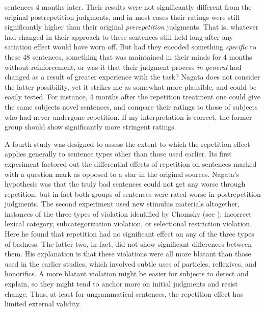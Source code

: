 sentences 4 months later. Their results were not significantly different from the original postrepetition judgments, and in most cases their ratings were still significantly higher than their original \textit{prerepetition} judgments. That is, whatever had changed in their approach to these sentences still held long after any satiation effect would have worn off. But had they encoded something \textit{specific} to these 48 sentences, something that was maintained in their minds for 4 months without reinforcement, or was it that their judgment process \textit{in general} had changed as a result of greater experience with the task? Nagata does not consider the latter possibility, yet it strikes me as somewhat more plausible, and could be easily tested. For instance, 4 months after the repetition treatment one could give the same subjects novel sentences, and compare their ratings to those of subjects who had never undergone repetition. If my interpretation is correct, the former group should show significantly more stringent ratings.

A fourth study \citep{Nagata1989d} was designed to assess the extent to which the repetition effect applies generally to sentence types other than those used earlier. Its first experiment factored out the differential effects of repetition on sentences marked with a question mark as opposed to a star in the original sources. Nagata's hypothesis was that the truly bad sentences could not get any worse through repetition, but in fact both groups of sentences were rated worse in postrepetition judgments. The second experiment used new stimulus materials altogether, instances of the three types of violation identified by Chomsky (see ): incorrect lexical category, subcategorization violation, or selectional restriction violation. Here he found that repetition had no significant effect on any of the three types of badness. The latter two, in fact, did not show significant differences between them. His explanation is that these violations were all more blatant than those used in the earlier studies, which involved subtle uses of particles, reflexives, and honorifics. A more blatant violation might be easier for subjects to detect and explain, so they might tend to anchor more on initial judgments and resist change. Thus, at least for ungrammatical sentences, the repetition effect has limited external validity.

